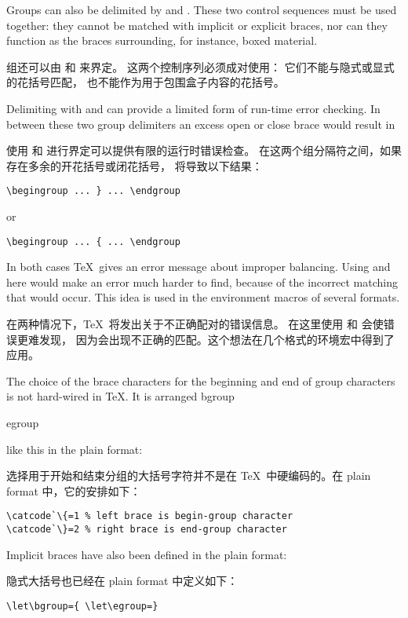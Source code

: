 Groups can also be delimited by  and
. These two control sequences must
be used together: they cannot be matched with implicit
or explicit braces, nor can they function as the braces
surrounding, for instance, boxed material.

组还可以由  和  来界定。
这两个控制序列必须成对使用：
它们不能与隐式或显式的花括号匹配，
也不能作为用于包围盒子内容的花括号。

Delimiting with  and  can
\label{begin:end:macros}%
provide a limited form of run-time error checking. 
In between these two group delimiters an excess
open or close brace would result in

使用  和  进行界定可以提供有限的运行时错误检查。
在这两个组分隔符之间，如果存在多余的开花括号或闭花括号，
将导致以下结果：
\begin{verbatim}
\begingroup ... } ... \endgroup
\end{verbatim}
or
\begin{verbatim}
\begingroup ... { ... \endgroup
\end{verbatim}
In both cases \TeX\ gives an error message about improper
balancing. Using  and  here would
make an error much harder to find, because of the incorrect
matching that would occur. This idea is used in the environment
macros of several formats.

在两种情况下，\TeX\ 将发出关于不正确配对的错误信息。
在这里使用  和  会使错误更难发现，
因为会出现不正确的匹配。这个想法在几个格式的环境宏中得到了应用。

The choice of the brace characters for the beginning and end of group
characters is not hard-wired in \TeX. It is arranged
\cstoidx bgroup\par\cstoidx egroup\par
like this in the plain format:

选择用于开始和结束分组的大括号字符并不是在 \TeX\ 中硬编码的。在 plain format 中，它的安排如下：
\begin{verbatim}
\catcode`\{=1 % left brace is begin-group character
\catcode`\}=2 % right brace is end-group character
\end{verbatim}
Implicit braces have also been defined in the plain format:

隐式大括号也已经在 plain format 中定义如下：
\begin{verbatim}
\let\bgroup={ \let\egroup=}
\end{verbatim}

